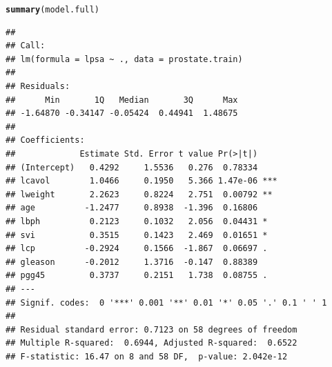 \documentclass{beamer}\usepackage[]{graphicx}\usepackage[]{color}
\makeatletter
\newcommand{\hlstd}[1]{\textcolor[rgb]{0.345,0.345,0.345}{#1}}%
\newcommand{\hlkwd}[1]{\textcolor[rgb]{0.737,0.353,0.396}{\textbf{#1}}}%
\newenvironment{kframe}{%
 \def\at@end@of@kframe{}%
 \ifinner\ifhmode%
  \def\at@end@of@kframe{\end{minipage}}%
  \begin{minipage}{\columnwidth}%
 \fi\fi%
 \def\FrameCommand##1{\hskip\@totalleftmargin \hskip-\fboxsep
 \colorbox{shadecolor}{##1}\hskip-\fboxsep
     \hskip-\linewidth \hskip-\@totalleftmargin \hskip\columnwidth}%
 \MakeFramed {\advance\hsize-\width
   \@totalleftmargin\z@ \linewidth\hsize
   \@setminipage}}%
 {\par\unskip\endMakeFramed%
 \at@end@of@kframe}
\newenvironment{knitrout}{}{} %
\makeatother
\begin{document}
\begin{frame}
\begin{knitrout}\tiny
{}\color{fgcolor}\begin{kframe}
\begin{alltt}
\hlkwd{summary}\hlstd{(model.full)}
\end{alltt}
\begin{verbatim}
## 
## Call:
## lm(formula = lpsa ~ ., data = prostate.train)
## 
## Residuals:
##      Min       1Q   Median       3Q      Max 
## -1.64870 -0.34147 -0.05424  0.44941  1.48675 
## 
## Coefficients:
##             Estimate Std. Error t value Pr(>|t|)    
## (Intercept)   0.4292     1.5536   0.276  0.78334    
## lcavol        1.0466     0.1950   5.366 1.47e-06 ***
## lweight       2.2623     0.8224   2.751  0.00792 ** 
## age          -1.2477     0.8938  -1.396  0.16806    
## lbph          0.2123     0.1032   2.056  0.04431 *  
## svi           0.3515     0.1423   2.469  0.01651 *  
## lcp          -0.2924     0.1566  -1.867  0.06697 .  
## gleason      -0.2012     1.3716  -0.147  0.88389    
## pgg45         0.3737     0.2151   1.738  0.08755 .  
## ---
## Signif. codes:  0 '***' 0.001 '**' 0.01 '*' 0.05 '.' 0.1 ' ' 1
## 
## Residual standard error: 0.7123 on 58 degrees of freedom
## Multiple R-squared:  0.6944,	Adjusted R-squared:  0.6522 
## F-statistic: 16.47 on 8 and 58 DF,  p-value: 2.042e-12
\end{verbatim}
\end{kframe}
\end{knitrout}
\end{frame}
\end{document}
